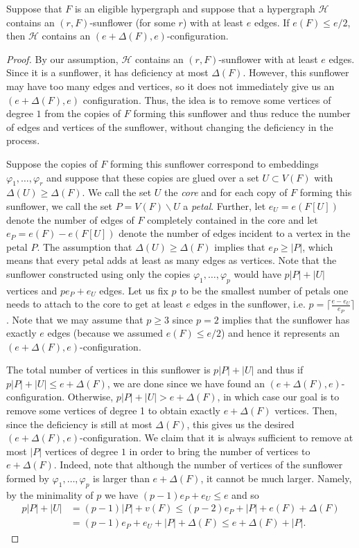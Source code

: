 \documentclass[10pt,a4paper]{amsart}
\def\cH{\mathcal{H}}
\begin{document}
\begin{lemma}\label{lemma:sunflower}
Suppose that $F$ is an eligible hypergraph and suppose that a hypergraph $\cH$ contains an $(r, F)$-sunflower (for some $r$) with at least $e$ edges. If $e(F)\leq e/2$, then $\cH$ contains an $(e+\Delta(F), e)$-configuration.
\end{lemma}

\begin{proof}
By our assumption, $\cH$ contains an $(r, F)$-sunflower with at least $e$ edges. Since it is a sunflower, it has deficiency at most $\Delta(F)$. However, this sunflower may have too many edges and vertices, so it does not immediately give us an $(e+\Delta(F), e)$ configuration. Thus, the idea is to remove some vertices of degree $1$ from the copies of $F$ forming this sunflower and thus reduce the number of edges and vertices of the sunflower, without changing the deficiency in the process.

Suppose the copies of $F$ forming this sunflower correspond to embeddings $\varphi_1, \dots, \varphi_r$ and suppose that these copies are glued over a set $U\subset V(F)$ with $\Delta(U)\geq \Delta(F)$. We call the set $U$ the \textit{core} and  for each copy of $F$ forming this sunflower, we call the set $P=V(F)\backslash U$ a \textit{petal}. Further, let $e_U=e(F[U])$ denote the number of edges of $F$ completely contained in the core and let $e_P=e(F)-e(F[U])$ denote the number of edges incident to a vertex in the petal $P$. The assumption that $\Delta(U)\geq \Delta(F)$ implies that $e_P\geq |P|$, which means that every petal adds at least as many edges as vertices. Note that the sunflower constructed using only the copies $\varphi_1, \dots, \varphi_p$ would have $p|P|+|U|$ vertices and $pe_P+e_U$ edges. Let us fix $p$ to be the smallest number of petals one needs to attach to the core to get at least $e$ edges in the sunflower, i.e. $p=\lceil\frac{e-e_U}{e_P}\rceil$. Note that we may assume that $p\geq 3$ since $p=2$ implies that the sunflower has exactly $e$ edges (because we assumed $e(F) \le e/2$) and hence it represents an $( e+\Delta(F), e)$-configuration.

The total number of vertices in this sunflower is $p|P|+|U|$ and thus if $p|P|+|U|\leq e+\Delta(F)$, we are done since we have found an $(e+\Delta(F), e)$-configuration. Otherwise, $p|P|+|U|> e+\Delta(F)$, in which case our goal is to remove some vertices of degree 1 to obtain exactly $e+\Delta(F)$ vertices. Then, since the deficiency is still at most $\Delta(F)$, this gives us the desired $(e+\Delta(F), e)$-configuration. We claim that it is always sufficient to remove at most $|P|$ vertices of degree $1$ in order to bring the number of vertices to $e+\Delta(F)$. Indeed, note that although the number of vertices of the sunflower formed by $\varphi_1, \dots, \varphi_p$ is larger than $e+\Delta(F)$, it cannot be much larger. Namely, by the minimality of $p$ we have $(p-1) e_P+e_U\leq e$ and so 
\begin{align*}
    p|P|+|U|&= (p-1)|P|+ v(F)\leq (p-2)e_P + |P| + e(F)+\Delta(F)\\
    &= (p-1)e_P+e_U+|P|+\Delta(F)\leq e+\Delta(F)+|P|.
\end{align*}


\end{proof}
\end{document}
